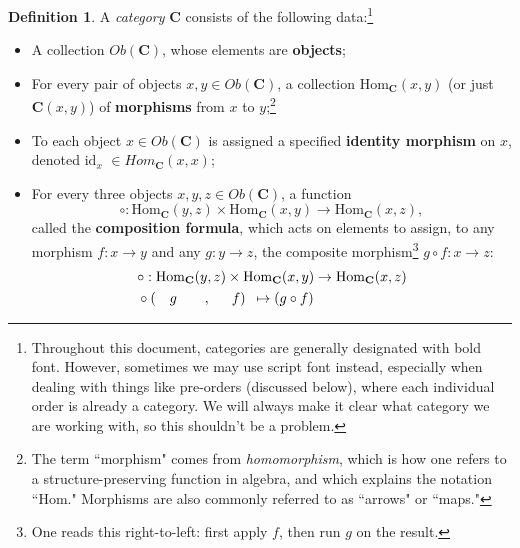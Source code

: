 \documentclass[11pt]{book}
\theoremstyle{definition}
\theoremstyle{definition}
\newtheorem{definition}{Definition}[section]
\theoremstyle{definition}
\theoremstyle{theorem}
\theoremstyle{definition}
\begin{document}
\begin{definition}
	A \textit{category} $\textbf{C}$  consists of the following data:\footnote{Throughout this document, categories are generally designated with bold font. However, sometimes we may use script font instead, especially when dealing with things like pre-orders (discussed below), where each individual order is already a category. We will always make it clear what category we are working with, so this shouldn't be a problem.} 
	\begin{itemize}
		\item A collection $Ob(\textbf{C})$, whose elements are \textbf{objects}; 
		\item For every pair of objects $x, y \in Ob(\textbf{C})$, a collection $\text{Hom}_{\textbf{C}}(x,y)$ (or just $\textbf{C}(x,y)$) of \textbf{morphisms} from $x$ to $y$;\footnote{The term ``morphism" comes from \textit{homomorphism}, which is how one refers to a structure-preserving function in algebra, and which explains the notation ``Hom." Morphisms are also commonly referred to as ``arrows" or ``maps."} 
		\item To each object $x \in Ob(\textbf{C})$ is assigned a specified \textbf{identity morphism} on $x$, denoted $\text{id}_x$ $\in Hom_{\textbf{C}}(x,x)$;
		\item For every three objects $x,y,z \in Ob(\textbf{C})$, a function 
		\begin{equation*}
		\circ: \text{Hom}_{\textbf{C}}(y,z) \times \text{Hom}_{\textbf{C}}(x,y) \rightarrow \text{Hom}_{\textbf{C}}(x,z),
		\end{equation*}
		called the \textbf{composition formula}, which acts on elements to assign, to any morphism $f: x \rightarrow y$ and any $g: y \rightarrow z$, the composite morphism\footnote{One reads this right-to-left: first apply $f$, then run $g$ on the result.} $g \circ f: x \rightarrow z$: 
		\begin{equation*}
		\begin{split} 
		& \circ: \text{Hom}_{\textbf{C}}(y,z) \times \text{Hom}_{\textbf{C}}(x,y) \rightarrow \text{Hom}_{\textbf{C}}(x,z) \\
		& \circ( \hspace*{1em} g \hspace*{2em}, \hspace*{1.5em}f) \hspace*{0.5em}\mapsto (g \circ f)  
		\end{split} 
		\end{equation*}

\end{itemize}
\end{definition}
\end{document}
